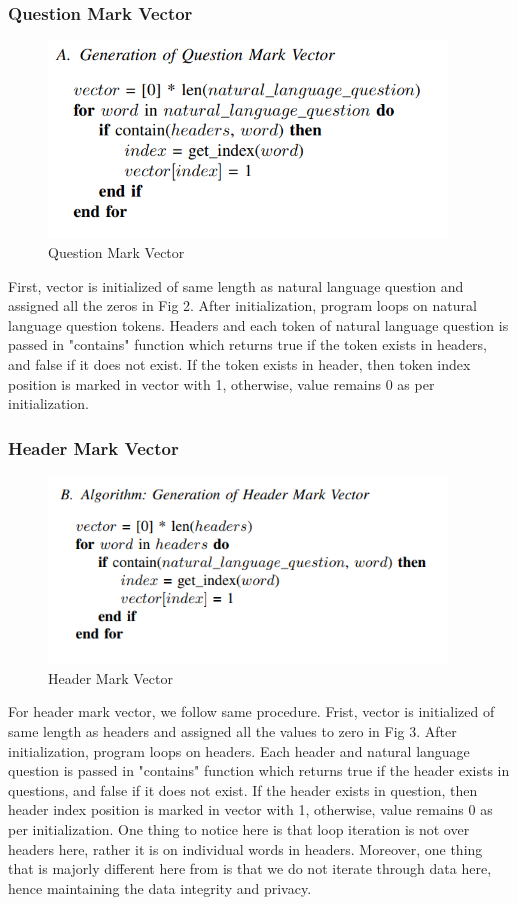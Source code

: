 \documentclass[12pt]{article}
\begin{document}
\subsubsection{Question Mark Vector}
\begin{figure}[H]
    \includegraphics[width=300pt]{QMV}
    \caption{Question Mark Vector}
    \label{fig:Question mark vector}
\end{figure}

First, vector is initialized of same length as natural language question and assigned all the zeros in Fig 2. After initialization, program loops on natural language question tokens. Headers and each token of natural language question is passed in "contains" function which returns true if the token exists in headers, and false if it does not exist. If the token exists in header, then token index position is marked in vector with 1, otherwise, value remains 0 as per initialization. 


\subsubsection{Header Mark Vector}
\begin{figure}[H]
    \includegraphics[width=300pt]{HMV}
    \caption{Header Mark Vector}
    \label{fig:Header mark vector}
\end{figure}

For header mark vector, we follow same procedure. Frist, vector is initialized of same length as headers and assigned all the values to zero in Fig 3. After initialization, program loops on headers. Each header and natural language question is passed in "contains" function which returns true if the header exists in questions, and false if it does not exist. If the header exists in question, then header index position is marked in vector with 1, otherwise, value remains 0 as per initialization. One thing to notice here is that loop iteration is not over headers here, rather it is on individual words in headers. Moreover, one thing that is majorly different here from \cite{guo2019content} is that we do not iterate through data here, hence maintaining the data integrity and privacy.
\end{document}

